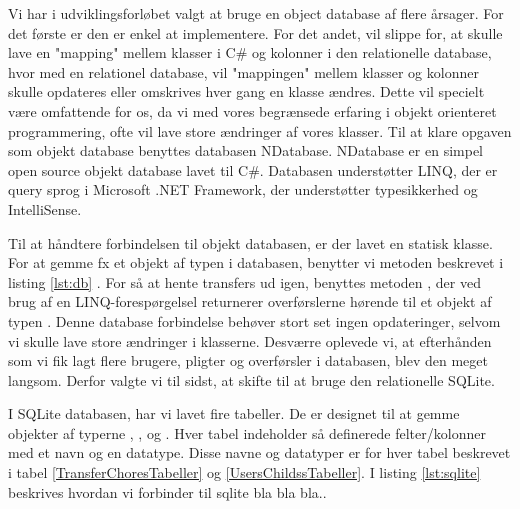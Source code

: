 Vi har i udviklingsforløbet valgt at bruge en object database af flere årsager. For det første er den er enkel at implementere. For det andet, vil slippe for, at skulle lave en "mapping" mellem klasser i C\# og kolonner i den relationelle database, hvor med en relationel database, vil "mappingen" mellem klasser og kolonner skulle opdateres eller omskrives hver gang en klasse ændres. Dette vil specielt være omfattende for os, da vi med vores begrænsede erfaring i objekt orienteret programmering, ofte vil lave store ændringer af vores klasser.
Til at klare opgaven som objekt database benyttes databasen NDatabase. NDatabase er en simpel open source objekt database lavet til C\#. Databasen understøtter LINQ, der er query sprog i Microsoft .NET Framework, der understøtter typesikkerhed og IntelliSense\cite{linqdok}.

Til at håndtere forbindelsen til objekt databasen, er der lavet en statisk klasse. For at gemme fx et objekt af typen  i databasen, benytter vi  metoden beskrevet i listing \ref{lst:db} . For så at hente transfers ud igen, benyttes metoden , der ved brug af en LINQ-forespørgelsel returnerer overførslerne hørende til et objekt af typen . Denne database forbindelse behøver stort set ingen opdateringer, selvom vi skulle lave store ændringer i klasserne.
Desværre oplevede vi, at efterhånden som vi fik lagt flere brugere, pligter og overførsler i databasen, blev den meget langsom. Derfor valgte vi til sidst, at skifte til at bruge den relationelle SQLite.


I SQLite databasen, har vi lavet fire tabeller. De er designet til at gemme objekter af typerne , ,  og . Hver tabel indeholder så definerede felter/kolonner med et navn og en datatype. Disse navne og datatyper er for hver tabel beskrevet i tabel \ref{TransferChoresTabeller} og \ref{UsersChildssTabeller}. 
I listing \ref{lst:sqlite} beskrives hvordan vi forbinder til sqlite bla bla bla..

\newcommand{\cent}[1]{\hspace*{\fill}#1\hspace*{\fill}}
 
